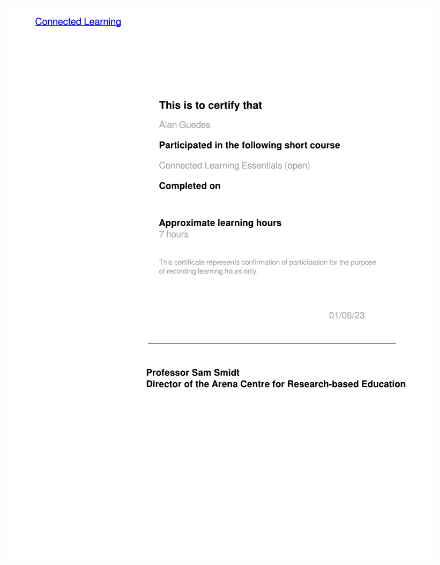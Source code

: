 \documentclass[10pt,a4paper,sans,colorlinks]{moderncv}
\begin{document}
\begin{figure}
    \includegraphics[align=t,width=\textwidth,height=0.5\paperheight, keepaspectratio=true]{certificates/ucl-training/ConnectedLearningEssentials.pdf}
\end{figure}
\end{document}
